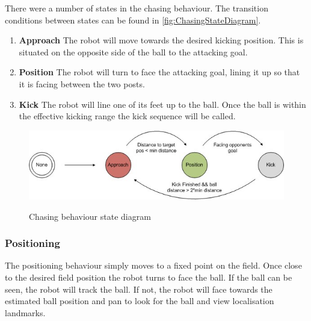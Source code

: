 There were a number of states in the chasing behaviour. The transition conditions between states can be found in \autoref{fig:ChasingStateDiagram}.
\begin{enumerate}
\item \textbf{Approach} The robot will move towards the desired kicking position. This is situated on the opposite side of the ball to the attacking goal.
\item \textbf{Position} The robot will turn to face the attacking goal, lining it up so that it is facing between the two posts.
\item \textbf{Kick} The robot will line one of its feet up to the ball. Once the ball is within the effective kicking range the kick sequence will be called.
\end{enumerate}

\begin{figure}[htpb]
\begin{center}
   \leavevmode
    \scalebox{0.8} {\includegraphics{figs/FieldPlayerChasingStates.jpg} }
    \caption{Chasing behaviour state diagram}
    \label{fig:ChasingStateDiagram}
\end{center}
\end{figure}

\subsubsection{Positioning}
The positioning behaviour simply moves to a fixed point on the field. Once close to the desired field position the robot turns to face the ball. If the ball can be seen, the robot will track the ball. If not, the robot will face towards the estimated ball position and pan to look for the ball and view localisation landmarks.

